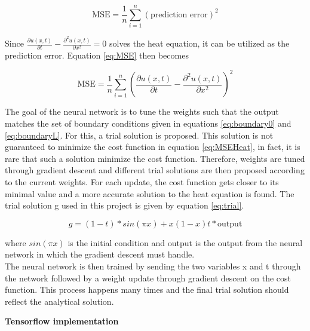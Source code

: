 \documentclass[12pt,a4paper]{article}
\begin{document}
\begin{equation}\label{eq:MSE}
\textrm{MSE} = \frac{1}{n} \sum_{i = 1}^n (\textrm{prediction error})^2
\end{equation}

\noindent Since $\frac{\partial u(x,t)}{\partial t} - \frac{\partial^2 u(x,t)}{\partial x^2} = 0$ solves the heat equation, it can be utilized as the prediction error. Equation \ref{eq:MSE} then becomes

\begin{equation}\label{eq:MSEHeat}
\textrm{MSE} = \frac{1}{n} \sum_{i = 1}^n (\frac{\partial u(x,t)}{\partial t} - \frac{\partial^2 u(x,t)}{\partial x^2})^2
\end{equation}

\noindent The goal of the neural network is to tune the weights such that the output matches the set of boundary conditions given in equations \ref{eq:boundary0} and \ref{eq:boundaryL}. For this, a trial solution is proposed. This solution is not guaranteed to minimize the cost function in equation \ref{eq:MSEHeat}, in fact, it is rare that such a solution minimize the cost function. Therefore, weights are tuned through gradient descent and different trial solutions are then proposed according to the current weights. For each update, the cost function gets closer to its minimal value and a more accurate solution to the heat equation is found. The trial solution g used in this project is given by equation \ref{eq:trial}.

\begin{equation}\label{eq:trial}
g = (1-t)*sin(\pi x) + x(1-x)t*\textrm{output}
\end{equation}

\noindent where $sin(\pi x)$ is the initial condition and output is the output from the neural network in which the gradient descent must handle. 
\\
The neural network is then trained by sending the two variables x and t through the network followed by a weight update through gradient descent on the cost function. This process happens many times and the final trial solution should reflect the analytical solution.

\begin{center}
\large{\textbf{Tensorflow implementation}}
\end{center}
\end{document}
